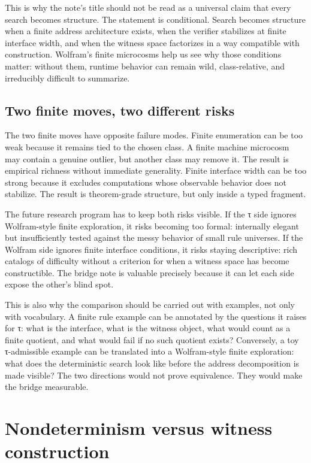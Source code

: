 \documentclass{pantarhei-researchnote}
\begin{document}
This is why the note's title should not be read as a universal claim that
every search becomes structure. The statement is conditional. Search
becomes structure when a finite address architecture exists, when the
verifier stabilizes at finite interface width, and when the witness space
factorizes in a way compatible with construction. Wolfram's finite
microcosms help us see why those conditions matter: without them, runtime
behavior can remain wild, class-relative, and irreducibly difficult to
summarize.

\subsection{Two finite moves, two different risks}

The two finite moves have opposite failure modes. Finite enumeration can
be too weak because it remains tied to the chosen class. A finite machine
microcosm may contain a genuine outlier, but another class may remove it.
The result is empirical richness without immediate generality. Finite
interface width can be too strong because it excludes computations whose
observable behavior does not stabilize. The result is theorem-grade
structure, but only inside a typed fragment.

The future research program has to keep both risks visible. If the τ
side ignores Wolfram-style finite exploration, it risks becoming too
formal: internally elegant but insufficiently tested against the messy
behavior of small rule universes. If the Wolfram side ignores finite
interface conditions, it risks staying descriptive: rich catalogs of
difficulty without a criterion for when a witness space has become
constructible. The bridge note is valuable precisely because it can let
each side expose the other's blind spot.

This is also why the comparison should be carried out with examples,
not only with vocabulary. A finite rule example can be annotated by the
questions it raises for τ: what is the interface, what is the witness
object, what would count as a finite quotient, and what would fail if no
such quotient exists? Conversely, a toy τ-admissible example can be
translated into a Wolfram-style finite exploration: what does the
deterministic search look like before the address decomposition is made
visible? The two directions would not prove equivalence. They would make
the bridge measurable.

\section{Nondeterminism versus witness construction}
\label{sec:nondeterminism}
\end{document}
